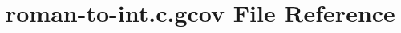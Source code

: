 \hypertarget{roman-to-int_8c_8gcov}{}\section{roman-\/to-\/int.c.\+gcov File Reference}
\label{roman-to-int_8c_8gcov}

